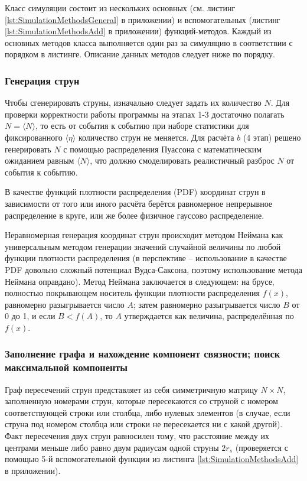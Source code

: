Класс симуляции состоит из нескольких основных (см. листинг \ref{lst:SimulationMethodsGeneral} в приложении) и вспомогательных (листинг \ref{lst:SimulationMethodsAdd} в приложении) функций-методов. Каждый из основных методов класса выполняется один раз за симуляцию в соответствии с порядком в листинге. Описание данных методов следует ниже по порядку.
\subsubsection{Генерация струн}
Чтобы сгенерировать струны, изначально следует задать их количество $N$. Для проверки корректности работы программы на этапах 1-3 достаточно полагать $N = \langle N \rangle$, то есть от события к событию при наборе статистики для фиксированного $\langle \eta \rangle$ количество струн не меняется. Для расчёта $b$ (4 этап) решено генерировать $N$ с помощью распределения Пуассона с математическим ожиданием равным $\langle N \rangle$, что должно смоделировать реалистичный разброс $N$ от события к событию. 

В качестве функций плотности распределения (PDF) координат струн в зависимости от того или иного расчёта берётся равномерное непрерывное распределение в круге, или же более физичное гауссово распределение. 

Неравномерная генерация координат струн происходит методом Неймана как универсальным методом генерации значений случайной величины по любой функции плотности распределения (в перспективе -- использование в качестве PDF довольно сложный потенциал Вудса-Саксона, поэтому использование метода Неймана оправдано). Метод Неймана заключается в следующем: на брусе, полностью покрывающем носитель функции плотности распределения $f(x)$, равномерно разыгрывается число $A$; затем равномерно разыгрывается число $B$ от 0 до 1, и если $B < f(A)$, то $A$ утверждается как величина, распределённая по $f(x)$.
\subsubsection{Заполнение графа и нахождение компонент связности; поиск максимальной компоненты}
Граф пересечений струн представляет из себя симметричную матрицу $N \times N$, заполненную номерами струн, которые пересекаются со струной с номером соответствующей строки или столбца, либо нулевых элементов (в случае, если струна под номером столбца или строки не пересекается ни с какой другой). Факт пересечения двух струн равносилен тому, что расстояние между их центрами меньше либо равно двум радиусам одной струны $2r_s$ (проверяется с помощью 5-й вспомогательной функции из листинга \ref{lst:SimulationMethodsAdd} в приложении). 

